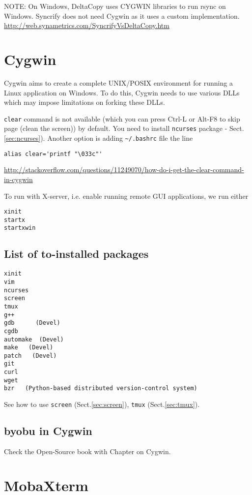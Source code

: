 NOTE: On Windows, DeltaCopy uses CYGWIN libraries to run rsync on Windows.
Syncrify does not need Cygwin as it uses a custom implementation. 
\url{http://web.synametrics.com/SyncrifyVsDeltaCopy.htm}


\section{Cygwin}
\label{sec:Cygwin}

Cygwin aims to create a complete UNIX/POSIX environment for running a Linux
application on Windows. To do this, Cygwin needs to use various DLLs which may
impose limitations on forking these DLLs.

\verb!clear! command is not available (which you can press Ctrl-L or Alt-F8 to
skip page (clean the screen)) by default. You need to install \verb!ncurses!
package - Sect.\ref{sec:ncurses}).
Another option is adding \verb!~/.bashrc! file the line
\begin{verbatim}
alias clear='printf "\033c"'
\end{verbatim}
\url{http://stackoverflow.com/questions/11249070/how-do-i-get-the-clear-command-in-cygwin}

To run with X-server, i.e. enable running remote GUI applications, we run either
\begin{verbatim}
xinit
startx
startxwin
\end{verbatim}

\subsection{List of to-installed packages}


\begin{verbatim}
xinit
vim
ncurses
screen
tmux
g++
gdb      (Devel)
cgdb
automake  (Devel)
make   (Devel)
patch   (Devel)
git
curl
wget
bzr   (Python-based distributed version-control system)
\end{verbatim}

See how to use \verb!screen! (Sect.\ref{sec:screen}), \verb!tmux!
(Sect.\ref{sec:tmux}). 


\subsection{byobu in Cygwin}

Check the Open-Source book with Chapter on Cygwin.


\section{MobaXterm}
\label{sec:MobaXterm}


